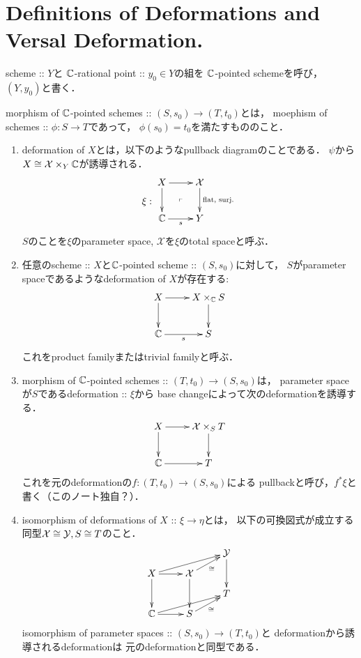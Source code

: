 \documentclass[a4paper]{jsarticle}
\newcommand{\famX}{\mathcal{X}}
\newcommand{\famY}{\mathcal{Y}}
\begin{document}
\section{Definitions of Deformations and Versal Deformation.}
\begin{Def}
    scheme :: $Y$と
    $\mathbb{C}$-rational point :: $y_0 \in Y$の組を
    $\mathbb{C}$-pointed schemeを呼び，$(Y, y_0)$と書く．

    morphism of $\mathbb{C}$-pointed schemes :: $(S, s_0) \to (T, t_0)$とは，
    moephism of schemes :: $\phi: S \to T$であって，
    $\phi(s_0)=t_0$を満たすもののこと．
\end{Def}

\begin{Def}
    \begin{enumerate}[label=(\roman*), leftmargin=*]
        \item 
        deformation of $X$とは，以下のようなpullback diagramのことである．
        $\psi$から$X \iso \famX \times_{Y} \C$が誘導される．
        \[
            \xi:
        \vcenter{\xymatrix{
            X \ar[r] \ar[d]& \famX \ar[d]^-{\text{flat, surj.}} \\
            \C \ar[r]_-{s}& Y
            \ar@{}[lu]|{\ulcorner}
        }}
        \]
        $S$のことを$\xi$のparameter space,
        $\famX$を$\xi$のtotal spaceと呼ぶ．

        \item
        任意のscheme :: $X$と$\mathbb{C}$-pointed scheme :: $(S, s_0)$に対して，
        $S$がparameter spaceであるようなdeformation of $X$が存在する:
        \[\xymatrix{
                X \ar[r]\ar[d]& X \times_{\C} S \ar[d]\\
                \C \ar[r]_-{s}& S
        }\]
        これをproduct familyまたはtrivial familyと呼ぶ．

        \item
        morphism of $\mathbb{C}$-pointed schemes :: $(T, t_0) \to (S, s_0)$は，
        parameter spaceが$S$であるdeformation :: $\xi$から
        base changeによって次のdeformationを誘導する．
        \[\xymatrix{
            X \ar[r]\ar[d]& \famX \times_S T \ar[d]\\
            \C \ar[r]& T
        }\]
        これを元のdeformationの$f: (T, t_0) \to (S, s_0)$による
        pullbackと呼び，$f^* \xi$と書く（このノート独自？）．

        \item
        isomorphism of deformations of $X$ :: $\xi \to \eta$とは，
        以下の可換図式が成立する同型$\famX \iso \famY, S \iso T$のこと．
        \[\xymatrix@R=8pt{
                {} & {} & \famY \ar[dd]\\
            X \ar[r]\ar[dd]\ar[rru]& \famX \ar[dd]\ar[ru]_-{\iso}& {} \\
            {} & {} & T \\
            \C \ar[r]\ar[rru]& S \ar[ru]_-{\iso}& {}
        }\]
        isomorphism of parameter spaces :: $(S, s_0) \to (T, t_0)$と
        deformationから誘導されるdeformationは
        元のdeformationと同型である．
    \end{enumerate}
    \end{Def}
\end{document}
